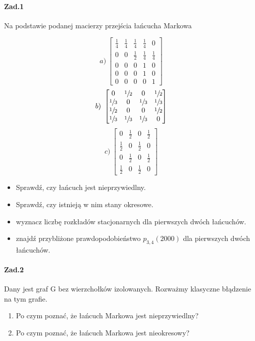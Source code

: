 \paragraph{Zad.1} Na podstawie podanej macierzy przejścia łańcucha Markowa
\begin{multicols}{3}
$$a)\ \begin{bmatrix}
\frac{1}{4}&\frac{1}{4}&\frac{1}{4}&\frac{1}{4}&0\\
0&0&\frac{1}{2}&\frac{1}{4}&\frac{1}{4}\\
0&0&0&1&0\\
0&0&0&1&0\\
0&0&0&0&1
\end{bmatrix}$$
$$b)\ \begin{bmatrix}
0&\sfrac{1}{2}&0&\sfrac{1}{2}\\
\sfrac{1}{3}&0&\sfrac{1}{3}&\sfrac{1}{3}\\
\sfrac{1}{2}&0&0&\sfrac{1}{2}\\
\sfrac{1}{3}&\sfrac{1}{3}&\sfrac{1}{3}&0
\end{bmatrix}$$
$$c)\ \begin{bmatrix}
0&\frac{1}{2}&0&\frac{1}{2}\\
\frac{1}{2}&0&\frac{1}{2}&0\\
0&\frac{1}{2}&0&\frac{1}{2}\\
\frac{1}{2}&0&\frac{1}{2}&0
\end{bmatrix}$$
\end{multicols}
\begin{itemize}
\item Sprawdź, czy łańcuch jest nieprzywiedlny.
\item Sprawdź, czy istnieją w nim stany okresowe.
\item wyznacz liczbę rozkładów stacjonarnych dla pierwszych dwóch łańcuchów.
\item znajdź przybliżone prawdopodobieństwo $p_{3,4}(2000)$ dla pierwszych dwóch łańcuchów.
\end{itemize}

\paragraph{Zad.2} Dany jest graf G bez wierzchołków izolowanych. Rozważmy klasyczne błądzenie na tym grafie.
\begin{enumerate}[label=\alph*)]
\item Po czym poznać, że łańcuch Markowa jest nieprzywiedlny?
\item Po czym poznać, że łańcuch Markowa jest nieokresowy?
\end{enumerate}

